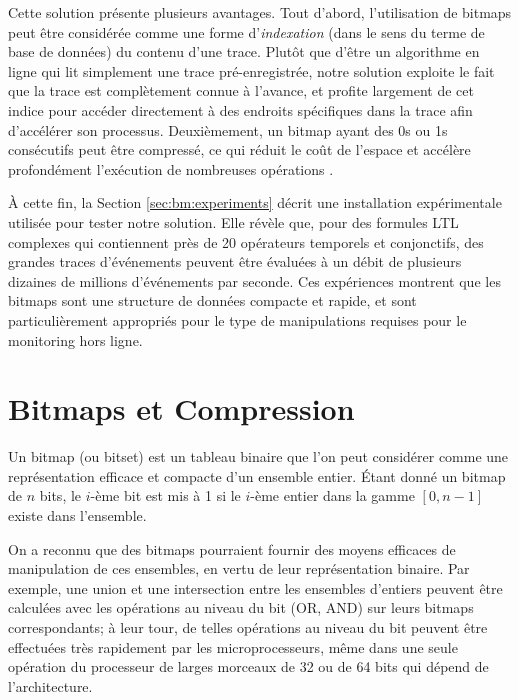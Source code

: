 Cette solution présente plusieurs avantages. Tout d'abord, l'utilisation de bitmaps peut être considérée comme une forme d'\emph{indexation} (dans le sens du terme de base de données) du contenu d'une trace. Plutôt que d'être un algorithme en ligne qui lit simplement une trace pré-enregistrée, notre solution exploite le fait que la trace est complètement connue à l'avance, et profite largement de cet indice pour accéder directement à des endroits spécifiques dans la trace afin d'accélérer son processus. Deuxièmement, un bitmap ayant des 0s ou 1s consécutifs peut être compressé, ce qui réduit le coût de l'espace et accélère profondément l'exécution de nombreuses opérations \citep{lemire2014}.

À cette fin, la Section \ref{sec:bm:experiments} décrit une installation expérimentale utilisée pour tester notre solution. Elle révèle que, pour des formules LTL complexes qui contiennent près de 20 opérateurs temporels et conjonctifs, des grandes traces d'événements peuvent être évaluées à un débit de plusieurs dizaines de millions d'événements par seconde. Ces expériences montrent que les bitmaps sont une structure de données compacte et rapide, et sont particulièrement appropriés pour le type de manipulations requises pour le monitoring hors ligne.

\section{Bitmaps et Compression}\label{sec:bm:compression} %

Un bitmap (ou bitset) est un tableau binaire que l'on peut considérer comme une représentation efficace et compacte d'un ensemble entier. Étant donné un bitmap de $n$ bits, le $i$-ème bit est mis à 1 si le $i$-ème entier dans la gamme $[0, n-1]$ existe dans l'ensemble.

On a reconnu que des bitmaps pourraient fournir des moyens efficaces de manipulation de ces ensembles, en vertu de leur représentation binaire. Par exemple, une union et une intersection entre les ensembles d'entiers peuvent être calculées avec les opérations au niveau du bit (OR, AND) sur leurs bitmaps correspondants; à leur tour, de telles opérations au niveau du bit peuvent être effectuées très rapidement par les microprocesseurs, même dans une seule opération du processeur de larges morceaux de 32 ou de 64 bits qui dépend de l'architecture.

